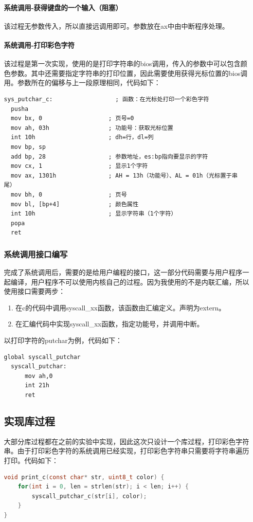 \documentclass[a4paper, 11pt]{article} %
\begin{document}
\paragraph{系统调用-获得键盘的一个输入（阻塞）}
该过程无参数传入，所以直接远调用即可。参数放在ax中由中断程序处理。
\paragraph{系统调用-打印彩色字符}
该过程是第一次实现，使用的是打印字符串的bios调用，传入的参数中可以包含颜色参数。其中还需要指定字符串的打印位置，因此需要使用获得光标位置的bios调用。参数所在的偏移与上一段原理相同，代码如下：
\begin{lstlisting}[language={[x86masm]Assembler},label=sysputcharc,caption=系统调用打印彩色字符过程]
  sys_putchar_c:                  ; 函数：在光标处打印一个彩色字符
  pusha
  mov bx, 0                   ; 页号=0
  mov ah, 03h                 ; 功能号：获取光标位置
  int 10h                     ; dh=行，dl=列
  mov bp, sp
  add bp, 28                  ; 参数地址，es:bp指向要显示的字符
  mov cx, 1                   ; 显示1个字符
  mov ax, 1301h               ; AH = 13h（功能号）、AL = 01h（光标置于串尾）
  mov bh, 0                   ; 页号
  mov bl, [bp+4]              ; 颜色属性
  int 10h                     ; 显示字符串（1个字符）
  popa
  ret
\end{lstlisting}

\subsubsection{系统调用接口编写}
完成了系统调用后，需要的是给用户编程的接口，这一部分代码需要与用户程序一起编译，用户程序不可以使用内核自己的过程。因为我使用的不是内联汇编，所以使用接口需要两步：
\begin{enumerate}
  \item 在c的代码中调用syscall\_xx函数，该函数由汇编定义。声明为extern。
  \item 在汇编代码中实现syscall\_xx函数，指定功能号，并调用中断。
\end{enumerate}
以打印字符的putchar为例，代码如下：
\begin{lstlisting}[language={[x86masm]Assembler},label=syscallputchar,caption=打印字符的系统调用]
  global syscall_putchar
  syscall_putchar:
      mov ah,0
      int 21h
      ret
\end{lstlisting}

\subsection{实现库过程}
大部分库过程都在之前的实验中实现，因此这次只设计一个库过程，打印彩色字符串。由于打印彩色字符的系统调用已经实现，打印彩色字符串只需要将字符串遍历打印。代码如下：
\begin{lstlisting}[language={c},label=printc,caption=打印彩色字符串函数]
  void print_c(const char* str, uint8_t color) {
    for(int i = 0, len = strlen(str); i < len; i++) {
        syscall_putchar_c(str[i], color);
    }
}
\end{lstlisting}
\end{document}
